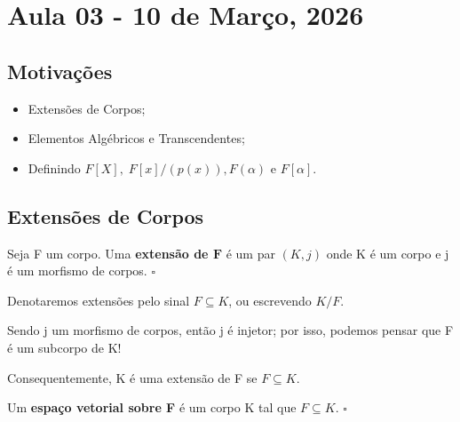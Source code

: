 \documentclass[../algebraIII_notes.tex]{subfiles}
\begin{document}
\section{Aula 03 - 10 de Março, 2026}
\subsection{Motivações}
\begin{itemize}
	\item Extensões de Corpos;
	\item Elementos Algébricos e Transcendentes;
	\item Definindo \(F[X],\; F[x]/(p(x)), F(\alpha )\) e \(F[\alpha ]\).
\end{itemize}
\subsection{Extensões de Corpos}
\begin{def*}
	Seja F um corpo. Uma \textbf{extensão de \(\mathbf{F}\)} é um par \((K, j)\) onde K é um corpo e j é um morfismo de corpos. \(\square\)
\end{def*}
Denotaremos extensões pelo sinal \(F \subseteq K\), ou escrevendo \(K/F\).
\begin{tcolorbox}[
		skin=enhanced,
		title=Observação,
		fonttitle=\bfseries,
		colframe=black,
		colbacktitle=cyan!75!white,
		colback=cyan!15,
		colbacklower=black,
		coltitle=black,
		drop fuzzy shadow,
	]
	Sendo j um morfismo de corpos, então j é injetor; por isso, podemos pensar que F é um subcorpo de K!

	Consequentemente, K é uma extensão de F se \(F\subseteq K\).
\end{tcolorbox}
\begin{def*}
	Um \textbf{espaço vetorial sobre F} é um corpo K tal que \(F\subseteq K\). \(\square\)
\end{def*}
\end{document}
